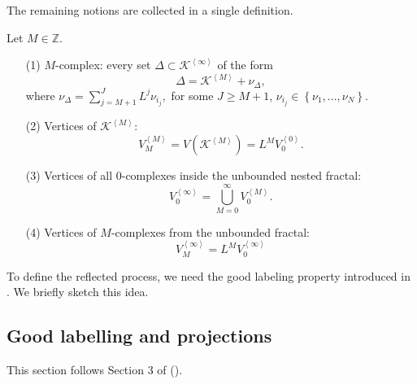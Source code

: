 \documentclass[11pt]{article}
\begin{document}
The remaining notions are collected in a single definition.
\begin{defi}\label{defi:MC}
Let $M\in\mathbb Z.$
\begin{itemize}
\item[(1)] $M$-complex: \label{def:Mcomplex}
every set $\Delta \subset \mathcal{K}^{\left\langle \infty \right\rangle}$ of the form
\begin{equation} \label{eq:Mcompl}
\Delta  = \mathcal{K}^{\left\langle M \right\rangle} + \nu_{\Delta},
\end{equation}
where $\nu_{\Delta}=\sum_{j=M+1}^{J} L^{j} \nu_{i_j},$ for some $J \geq M+1$, $\nu_{i_j} \in \left\{\nu_1,...,\nu_N\right\}$.
\item[(2)] Vertices of $\mathcal{K}^{\left\langle M \right\rangle}$:
$$
V^{\left\langle M\right\rangle}_{M} = V\left(\mathcal{K}^{\left\langle M \right\rangle}\right) = L^M V^{\left\langle 0\right\rangle}_{0}.
$$
\item[(3)] Vertices of all 0-complexes inside the unbounded nested fractal:
$$
V^{\left\langle \infty \right\rangle}_{0} = \bigcup_{M=0}^{\infty} V^{\left\langle M\right\rangle}_{0}.
$$
\item[(4)] Vertices of $M$-complexes from the unbounded fractal:
$$
V^{\left\langle \infty \right\rangle}_{M} = L^{M} V^{\left\langle \infty \right\rangle}_{0}
$$
\end{itemize}
\end{defi}

To define the reflected process, we need the good labeling property
introduced in \cite{bib:KaPP2}. We briefly sketch this idea.

\subsection{Good labelling and projections}\label{sec:labelling}
This section follows Section 3 of (\cite{bib:KaPP2}).\\
\end{document}
